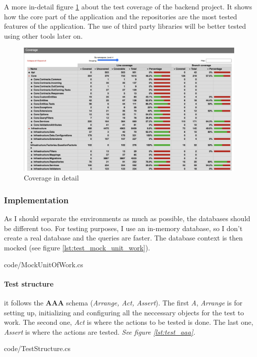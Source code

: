 A more in-detail figure \ref{fig:test_coverage_detail} about the test coverage of the backend project. It shows how the core part of the application and the repositories are the most 
tested features of the application. The use of third party libraries will be better tested using other tools later on.
\begin{figure}[H]
    \centering
        \includegraphics[width=\textwidth]{assets/coverage_detail.png}
    \caption{Coverage in detail}
    \label{fig:test_coverage_detail}
\end{figure}

\subsubsection{Implementation}
    As I should separate the environments as much as possible, the databases should be different too. For testing purposes, I use an in-memory database, so I don't 
    create a real database and the queries are faster. 
    The database context is then mocked (see figure \ref{lst:test_mock_unit_work}).

    
    {code/MockUnitOfWork.cs}

\paragraph{Test structure} it follows the \textbf{AAA} schema (\textit{Arrange, Act, Assert}). 
    The first \textit{A}, \textit{Arrange} is for setting up, initializing and configuring all the neccessary objects for the test to work. 
    The second one, \textit{Act} is where the actions to be tested is done. 
    The last one, \textit{Assert} is where the actions are tested. \textit{See figure \ref{lst:test_aaa}.}
    
    {code/TestStructure.cs}

